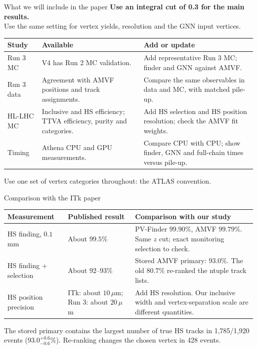 \begin{frame}{What we will include in the paper}
\small
\textbf{Use an integral cut of 0.3 for the main results.}\\[.4em]
Use the same setting for vertex yields, resolution and the GNN input vertices.
\par\vspace{.6em}
\centering\footnotesize\renewcommand{\arraystretch}{1.2}
\begin{tabular}{p{2.1cm}p{4.35cm}p{6.35cm}}
\toprule
Study & Available & Add or update\\
\midrule
Run 3 MC & V4 has Run 2 MC validation. & Add representative Run 3 MC; finder and GNN against AMVF.\\
Run 3 data & Agreement with AMVF positions and track assignments. & Compare the same observables in data and MC, with matched pile-up.\\
HL-LHC MC & Inclusive and HS efficiency; TTVA efficiency, purity and categories. & Add HS selection and HS position resolution; check the AMVF fit weights.\\
Timing & Athena CPU and GPU measurements. & Compare CPU with CPU; show finder, GNN and full-chain times versus pile-up.\\
\bottomrule
\end{tabular}
\par\vspace{.5em}\raggedright\small
Use one set of vertex categories throughout: the ATLAS convention.
\end{frame}

\begin{frame}{Comparison with the ITk paper}
\centering\small\renewcommand{\arraystretch}{1.25}
\begin{tabular}{p{3.05cm}p{3.05cm}p{6.6cm}}
\toprule
Measurement & Published result & Comparison with our study\\
\midrule
HS finding, $0.1$ mm & About $99.5\%$ & PV-Finder $99.90\%$, AMVF $99.79\%$. Same $z$ cut; exact monitoring selection to check.\\
HS finding + selection & About $92$--$93\%$ & Stored AMVF primary: $93.0\%$. The old $80.7\%$ re-ranked the ntuple track lists.\\
HS position precision & ITk: about $10\,\mu$m; Run 3: about $20\,\mu$m & Add HS resolution. Our inclusive width and vertex-separation scale are different quantities.\\
\bottomrule
\end{tabular}
\par\vspace{.6em}\raggedright\small
The stored primary contains the largest number of true HS tracks in 1,785/1,920 events ($93.0^{+0.6}_{-0.6}\%$). Re-ranking changes the chosen vertex in 428 events.
\end{frame}

